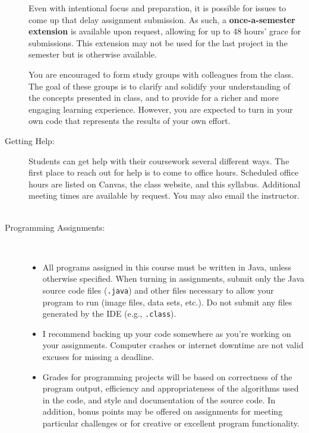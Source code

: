 \documentclass [letterpaper,11pt]{article}
\begin{document}
\begin{description}
Even with intentional focus and preparation, it is possible for issues to come up that delay assignment submission.  As such, a \textbf{once-a-semester extension} is available upon request, allowing for up to 48 hours' grace for submissions. This extension may not be used for the last project in the semester but is otherwise available.

You are encouraged to form study groups with colleagues from the class. The goal of these groups is to clarify and solidify your understanding of the concepts presented in class, and to provide for a richer and more engaging learning experience. However, you are expected to turn in your own code that represents the results of your own effort. 

\item[Getting Help:]
Students can get help with their coursework several different ways. The first place to
reach out for help is to come to office hours. Scheduled office hours are listed on Canvas, the class website, and this syllabus.
Additional meeting times are available by request. You may also email the instructor.
\\\\
\item[Programming Assignments:]\

\begin{itemize}\setlength{\itemsep}{0em}\setlength{\parskip}{0pt}
	\item All programs assigned in this course must be written in Java, unless otherwise specified.  When turning in assignments,
	submit only the Java source code files (\texttt{.java}) and other files necessary to allow your program to run (image files, data sets, etc.). Do not submit any files generated by the IDE (e.g., \texttt{.class}).	
			\item I recommend backing up your code somewhere as you're working on your assignments.  Computer
		crashes or internet downtime are not valid excuses for missing a deadline.
				
\item Grades for programming projects will be based on correctness of the program output, efficiency and appropriateness of the algorithms used in the code, and style and documentation of the source code.  In addition, bonus points may be offered on assignments for meeting particular challenges or for creative or excellent program functionality.


\end{itemize}
\end{description}
\end{document}
